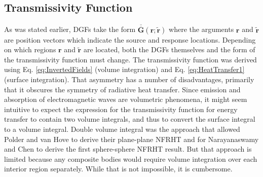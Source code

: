 \subsection{Transmissivity Function}
%
As was stated earlier, DGFs take the form $\overline{\overline{\boldsymbol{G}}}(\boldsymbol{r}; \widetilde{\boldsymbol{r}})$ where the arguments $\boldsymbol{r}$ and $\widetilde{\boldsymbol{r}}$ are position vectors which indicate the source and response locations. Depending on which regions $\boldsymbol{r}$ and $\widetilde{\boldsymbol{r}}$ are located, both the DGFs themselves and the form of the transmissivity function must change. The transmissivity function was derived using Eq. \ref{eq:InvertedFields} (volume integration) and Eq. \ref{eq:HeatTransfer1} (surface integration). That asymmetry has a number of disadvantages, primarily that it obscures the symmetry of radiative heat transfer. Since emission and absorption of electromagnetic waves are volumetric phenomena, it might seem intuitive to expect the expression for the transmissivity function for energy transfer to contain two volume integrals, and thus to convert the surface integral to a volume integral. Double volume integral was the approach that allowed Polder and van Hove to derive their plane-plane NFRHT\cite{Polder1971} and for Narayanaswamy and Chen to derive the first sphere-sphere NFRHT result.\cite{Narayanaswamy2008} But that approach is limited because any composite bodies would require volume integration over each interior region separately. While that is not impossible, it is cumbersome.

